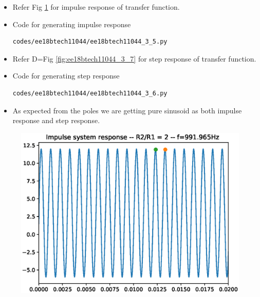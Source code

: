 \begin{enumerate}[label=\arabic*.,ref=\theenumi]
\begin{itemize}
\item Refer Fig \ref{fig:ee18btech11044_3_6} for impulse response of transfer function.
\item Code for generating impulse response
\begin{lstlisting}
codes/ee18btech11044/ee18btech11044_3_5.py
\end{lstlisting}
\item Refer D=Fig \ref{fig:ee18btech11044_3_7} for step response of transfer function.
\item Code for generating step response
\begin{lstlisting}
codes/ee18btech11044/ee18btech11044_3_6.py
\end{lstlisting}
\item As expected from the poles we are getting pure sinusoid as both impulse response and step response.
\end{itemize}

\begin{figure}[!ht]
\centering
\includegraphics[width=\columnwidth]{./figs/ee18btech11044/ee18btech11044_3_6.eps}
\caption{}
\label{fig:ee18btech11044_3_6}
\end{figure}


\end{enumerate}
